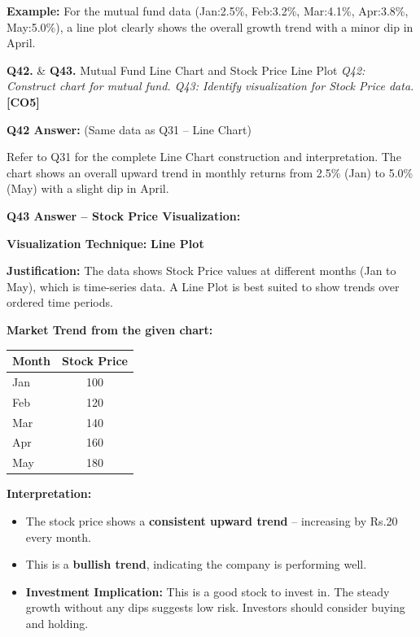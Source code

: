 \documentclass[12pt,a4paper]{article}
\newcommand{\Qno}[1]{\textbf{\color{darkred}Q#1.}}
\newcommand{\term}[1]{\textbf{\color{headingcolor}#1}}
\newcommand{\rupee}{\textrm{Rs.}}
\begin{document}
\begin{answerenv}
\begin{keypoint}
\textbf{Example:} For the mutual fund data (Jan:2.5\%, Feb:3.2\%, Mar:4.1\%, Apr:3.8\%, May:5.0\%), a line plot clearly shows the overall growth trend with a minor dip in April.
\end{keypoint}

\end{answerenv}

\vspace{8pt}

\begin{questionbox}{\Qno{42} \& \Qno{43} Mutual Fund Line Chart and Stock Price Line Plot}
\textit{Q42: Construct chart for mutual fund. Q43: Identify visualization for Stock Price data.} \hfill \textbf{[CO5]}
\end{questionbox}

\begin{answerenv}

\textbf{\color{headingcolor}Q42 Answer:} (Same data as Q31 -- Line Chart)

Refer to Q31 for the complete Line Chart construction and interpretation. The chart shows an overall upward trend in monthly returns from 2.5\% (Jan) to 5.0\% (May) with a slight dip in April.

\vspace{8pt}
\textbf{\color{headingcolor}Q43 Answer -- Stock Price Visualization:}

\textbf{Visualization Technique:} \term{Line Plot}

\textbf{Justification:} The data shows Stock Price values at different months (Jan to May), which is time-series data. A Line Plot is best suited to show trends over ordered time periods.

\textbf{Market Trend from the given chart:}
\begin{center}
\begin{tabular}{lc}
\toprule
\textbf{Month} & \textbf{Stock Price} \\
\midrule
Jan & 100 \\
Feb & 120 \\
Mar & 140 \\
Apr & 160 \\
May & 180 \\
\bottomrule
\end{tabular}
\end{center}

\textbf{Interpretation:}
\begin{itemize}[leftmargin=1.5em, itemsep=3pt]
  \item The stock price shows a \term{consistent upward trend} -- increasing by \rupee20 every month.
  \item This is a \term{bullish trend}, indicating the company is performing well.
  \item \term{Investment Implication:} This is a good stock to invest in. The steady growth without any dips suggests low risk. Investors should consider buying and holding.
\end{itemize}

\end{answerenv}
\end{document}
